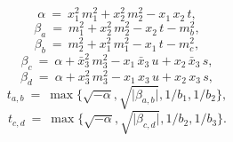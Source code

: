 \documentclass[preprint,superscriptaddress,nofootinbib]{revtex4}
\begin{document}
\begin{appendix}
   \begin{equation}
  {\alpha}\ =\ x_{1}^{2}\,m_{1}^{2}+x_{2}^{2}\,m_{2}^{2}-x_{1}\,x_{2}\,t
   \label{amp:ae},
   \end{equation}
   \begin{equation}
  {\beta}_{a}\ =\ m_{1}^{2} + x_{2}^{2}\,m_{2}^{2}-x_{2}\,t-m_{b}^{2}
   \label{amp:ba},
   \end{equation}
   \begin{equation}
  {\beta}_{b}\ =\ m_{2}^{2}+x_{1}^{2}\,m_{1}^{2}-x_{1}\,t - m_{c}^{2}
   \label{amp:bb},
   \end{equation}
   \begin{equation}
  {\beta}_{c}\ =\ {\alpha} + \bar{x}_{3}^{2}\,m_{3}^{2}
  -x_{1}\,\bar{x}_{3}\,u +x_{2}\,\bar{x}_{3}\,s
   \label{amp:bc},
   \end{equation}
   \begin{equation}
  {\beta}_{d}\ =\ {\alpha}+x_{3}^{2}\,m_{3}^{2}-x_{1}\,x_{3}\,u+x_{2}\,x_{3}\,s
   \label{amp:bd},
   \end{equation}
   \begin{equation}
   t_{a,b}\ =\ {\max}\{ \sqrt{-{\alpha}},\sqrt{{\vert}{\beta}_{a,b}{\vert}},1/b_{1},1/b_{2} \}
   \label{amp:tab},
   \end{equation}
   \begin{equation}
   t_{c,d}\ =\ {\max}\{ \sqrt{-{\alpha}},\sqrt{{\vert}{\beta}_{c,d}{\vert}},1/b_{2},1/b_{3} \}
   \label{amp:tcd}.
   \end{equation}
  \end{appendix}
\end{document}
